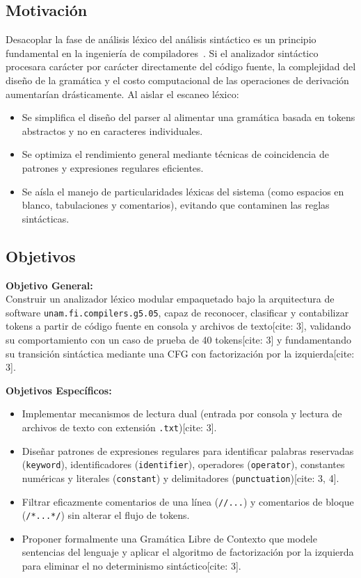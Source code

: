 \documentclass[letterpaper,12pt,oneside]{article}
\begin{document}
\subsection{Motivación}
Desacoplar la fase de análisis léxico del análisis sintáctico es un principio fundamental en la ingeniería de compiladores~\cite{10.5555/576122}. Si el analizador sintáctico procesara carácter por carácter directamente del código fuente, la complejidad del diseño de la gramática y el costo computacional de las operaciones de derivación aumentarían drásticamente. Al aislar el escaneo léxico:
\begin{itemize}
    \item Se simplifica el diseño del parser al alimentar una gramática basada en tokens abstractos y no en caracteres individuales.
    \item Se optimiza el rendimiento general mediante técnicas de coincidencia de patrones y expresiones regulares eficientes.
    \item Se aísla el manejo de particularidades léxicas del sistema (como espacios en blanco, tabulaciones y comentarios), evitando que contaminen las reglas sintácticas.
\end{itemize}

\subsection{Objetivos}
\textbf{Objetivo General:} \\
Construir un analizador léxico modular empaquetado bajo la arquitectura de software \texttt{unam.fi.compilers.g5.05}, capaz de reconocer, clasificar y contabilizar tokens a partir de código fuente en consola y archivos de texto[cite: 3], validando su comportamiento con un caso de prueba de 40 tokens[cite: 3] y fundamentando su transición sintáctica mediante una CFG con factorización por la izquierda[cite: 3].

\textbf{Objetivos Específicos:}
\begin{itemize}
    \item Implementar mecanismos de lectura dual (entrada por consola y lectura de archivos de texto con extensión \texttt{.txt})[cite: 3].
    \item Diseñar patrones de expresiones regulares para identificar palabras reservadas (\texttt{keyword}), identificadores (\texttt{identifier}), operadores (\texttt{operator}), constantes numéricas y literales (\texttt{constant}) y delimitadores (\texttt{punctuation})[cite: 3, 4].
    \item Filtrar eficazmente comentarios de una línea (\texttt{//...}) y comentarios de bloque (\texttt{/*...*/}) sin alterar el flujo de tokens.
    \item Proponer formalmente una Gramática Libre de Contexto que modele sentencias del lenguaje y aplicar el algoritmo de factorización por la izquierda para eliminar el no determinismo sintáctico[cite: 3].
\end{itemize}
\end{document}
